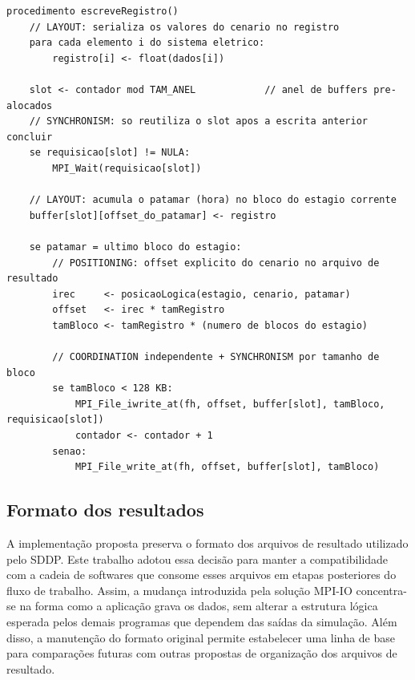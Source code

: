\begin{codigo}[H]
  \centering
  \begin{lstlisting}[style=pseudocodigo]
procedimento escreveRegistro()
    // LAYOUT: serializa os valores do cenario no registro
    para cada elemento i do sistema eletrico:
        registro[i] <- float(dados[i])

    slot <- contador mod TAM_ANEL            // anel de buffers pre-alocados
    // SYNCHRONISM: so reutiliza o slot apos a escrita anterior concluir
    se requisicao[slot] != NULA:
        MPI_Wait(requisicao[slot])

    // LAYOUT: acumula o patamar (hora) no bloco do estagio corrente
    buffer[slot][offset_do_patamar] <- registro

    se patamar = ultimo bloco do estagio:
        // POSITIONING: offset explicito do cenario no arquivo de resultado
        irec     <- posicaoLogica(estagio, cenario, patamar)
        offset   <- irec * tamRegistro
        tamBloco <- tamRegistro * (numero de blocos do estagio)

        // COORDINATION independente + SYNCHRONISM por tamanho de bloco
        se tamBloco < 128 KB:
            MPI_File_iwrite_at(fh, offset, buffer[slot], tamBloco, requisicao[slot])
            contador <- contador + 1
        senao:
            MPI_File_write_at(fh, offset, buffer[slot], tamBloco)
  \end{lstlisting}
  \caption{Pseudocódigo da escrita independente executada por cada
  \textit{rank} trabalhador ao concluir um cenário (método
  \texttt{escreveRegistro}), anotado segundo os aspectos de acesso a dados do
  MPI-IO --- \textit{positioning}, \textit{coordination} e
  \textit{synchronism}~\cite{mpiCite,Rr:10} --- e a decisão de \textit{layout}
  dos blocos.}
  \label{cod:pseudocodigo_writeregistry}
\end{codigo}

\subsection{Formato dos resultados}
\label{sec:formato_resultados}

A implementação proposta preserva o formato dos arquivos de resultado
utilizado pelo SDDP. Este trabalho adotou essa decisão para manter a compatibilidade
com a cadeia de softwares que consome esses arquivos em etapas posteriores
do fluxo de trabalho. Assim, a mudança introduzida pela solução MPI-IO
concentra-se na forma como a aplicação grava os dados, sem alterar a
estrutura lógica esperada pelos demais programas que dependem das saídas da
simulação.
Além disso, a manutenção do formato original permite estabelecer uma linha de
base para comparações futuras com outras propostas de organização dos arquivos
de resultado.

